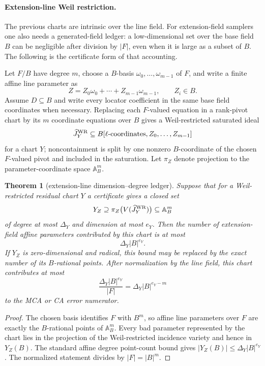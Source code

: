 \documentclass[11pt]{article}
\newtheorem{theorem}{Theorem}[section]
\theoremstyle{definition}
\theoremstyle{remark}
\newcommand{\B}{B}
\begin{document}
\paragraph{Extension-line Weil restriction.}
The previous charts are intrinsic over the line field.  For extension-field
samplers one also needs a generated-field ledger: a low-dimensional set over the
base field $\B$ can be negligible after division by $|F|$, even when it is large
as a subset of $\B$.  The following is the certificate form of that accounting.

Let $F/\B$ have degree $m$, choose a $\B$-basis
$\omega_0,\ldots,\omega_{m-1}$ of $F$, and write a finite affine line parameter
as
\[
        Z=Z_0\omega_0+\cdots+Z_{m-1}\omega_{m-1},
        \qquad Z_i\in\B .
\]
Assume $D\subseteq\B$ and write every locator coefficient in the same base field
coordinates when necessary.  Replacing each $F$-valued equation in a rank-pivot
chart by its $m$ coordinate equations over $\B$ gives a Weil-restricted saturated
ideal
\[
        \widehat J^{\rm WR}_{Y}
        \subseteq
        \B[\ell\text{-coordinates},Z_0,\ldots,Z_{m-1}]
\]
for a chart $Y$; noncontainment is split by one nonzero $\B$-coordinate of the
chosen $F$-valued pivot and included in the saturation.
Let $\pi_Z$ denote projection to the parameter-coordinate space
$\mathbb A^m_{\B}$.

\begin{theorem}[extension-line dimension--degree ledger]
\label{thm:extension-line-dimension-degree-ledger}
Suppose that for a Weil-restricted residual chart $Y$ a certificate gives a
closed set
\[
        Y_Z\supseteq \pi_Z\bigl(V(\widehat J^{\rm WR}_{Y})\bigr)
        \subseteq \mathbb A^m_{\B}
\]
of degree at most $\Delta_Y$ and dimension at most $e_Y$.  Then the number of
extension-field affine parameters contributed by this chart is at most
\[
        \Delta_Y |\B|^{e_Y}.
\]
If $Y_Z$ is zero-dimensional and radical, this bound may be replaced by the
exact number of its $\B$-rational points.  After normalization by the line field,
this chart contributes at most
\[
        \frac{\Delta_Y |\B|^{e_Y}}{|F|}
        =\Delta_Y |\B|^{e_Y-m}
\]
to the MCA or CA error numerator.
\end{theorem}

\begin{proof}
The chosen basis identifies $F$ with $\B^m$, so affine line parameters over $F$
are exactly the $\B$-rational points of $\mathbb A^m_{\B}$.  Every bad parameter
represented by the chart lies in the projection of the Weil-restricted incidence
variety and hence in $Y_Z(\B)$.  The standard affine degree point-count bound gives
$|Y_Z(\B)|\le\Delta_Y|\B|^{e_Y}$.  The normalized statement divides by
$|F|=|\B|^m$.
\end{proof}
\end{document}
